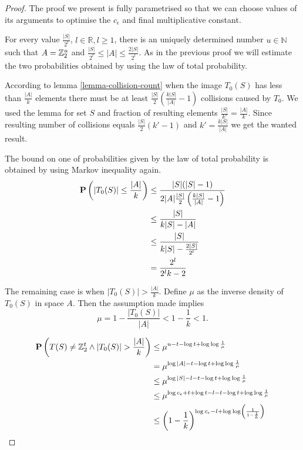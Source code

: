 \begin{proof}
The proof we present is fully parametrised so that we can choose values of its arguments to optimise the $c_\epsilon$ and final multiplicative constant.

For every value $\frac{|S|}{2^l}$, $l \in \mathbb{R}, l \geq 1$, there is an uniquely determined number $u \in \mathbb{N}$ such that $A = \mathbb{Z}_{2}^{u}$ and $\frac{|S|}{2 ^ l} \leq |A| \leq \frac{2|S|}{2 ^ l}$. As in the previous proof we will estimate the two probabilities obtained by using the law of total probability.

According to lemma \ref{lemma-collision-count} when the image $T_0(S)$ has less than $\frac{|A|}{k}$ elements there must be at least $\frac{|S|}{2}\left(\frac{k|S|}{|A|} - 1\right)$ collisions caused by $T_0$. We used the lemma for set $S$ and fraction of resulting elements $\frac{|S|}{k'} = \frac{|A|}{k}$. Since resulting number of collisions equals $\frac{|S|}{2}(k' - 1)$ and $k' = \frac{k|S|}{|A|}$ we get the wanted result.

The bound on one of probabilities given by the law of total probability is obtained by using Markov inequality again.
\[
\begin{split}
\mathbf{P}\left(|T_0(S)| \leq \frac{|A|}{k}\right) 
	& \leq \frac{|S|(|S| - 1)}{2|A|\frac{|S|}{2}\left(\frac{k|S|}{|A|} - 1\right)} \\
	& \leq \frac{|S|}{k|S| - |A|} \\
	& \leq \frac{|S|}{k|S| - \frac{2|S|}{2^l}} \\ 
	& = \frac{2^l}{2^l k - 2} \\
\end{split}
\]

The remaining case is when $|T_0(S)| > \frac {|A|}{k}$. Define $\mu$ as the inverse density of $T_0(S)$ in space $A$. Then the assumption made implies
\[
	\mu = 1 - \frac{|T_0(S)|}{|A|} < 1 - \frac{1}{k} < 1 \text{.}
\]

\[
\begin{split}
\mathbf{P}\left(T(S) \neq \mathbb{Z}_{2}^{t} \wedge |T_0(S)| > \frac {|A|}{k}\right) 
	& \leq \mu ^ {u - t - \log t + \log \log \frac{1}{\mu}} \\ 
	& = \mu ^ {\log |A| - t - \log t + \log \log \frac{1}{\mu}} \\ 
	& \leq \mu ^ {\log |S| - l - t - \log t + \log \log \frac{1}{\mu}} \\ 
	& \leq \mu ^ {\log c_\epsilon + t + \log t - l - t - \log t + \log \log \frac{1}{\mu}} \\ 
	& \leq \left(1 - \frac{1}{k}\right) ^ {\log c_\epsilon - l + \log \log \left(\frac{1}{1 - \frac{1}{k}} \right)}
\end{split}
\]


\end{proof}
